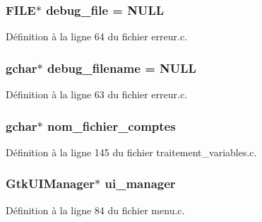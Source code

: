 \subsubsection[{debug\_\-file}]{\setlength{\rightskip}{0pt plus 5cm}FILE$\ast$ {\bf debug\_\-file} = NULL}\label{erreur_8c_af5cc516f4d3c010da348387f6910a556}


Définition à la ligne 64 du fichier erreur.c.

\subsubsection[{debug\_\-filename}]{\setlength{\rightskip}{0pt plus 5cm}gchar$\ast$ {\bf debug\_\-filename} = NULL}\label{erreur_8c_a4e0221c19e6c3e0722120ec7b55ca600}


Définition à la ligne 63 du fichier erreur.c.

\subsubsection[{nom\_\-fichier\_\-comptes}]{\setlength{\rightskip}{0pt plus 5cm}gchar$\ast$ {\bf nom\_\-fichier\_\-comptes}}\label{erreur_8c_ae00b9af94c75169e6ab8cf0ec25e8b89}


Définition à la ligne 145 du fichier traitement\_\-variables.c.

\subsubsection[{ui\_\-manager}]{\setlength{\rightskip}{0pt plus 5cm}GtkUIManager$\ast$ {\bf ui\_\-manager}}\label{erreur_8c_aa6a3b64b294a67080fe530ae293bce63}


Définition à la ligne 84 du fichier menu.c.

